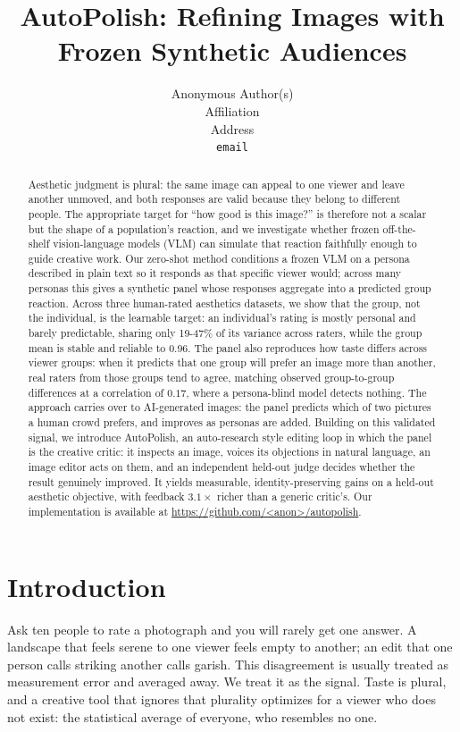 \documentclass{article}
\title{AutoPolish: Refining Images with Frozen Synthetic Audiences}
\author{%
  Anonymous Author(s)\\
  Affiliation\\
  Address\\
  \texttt{email}\\
}
\begin{document}
\maketitle


\begin{abstract}
Aesthetic judgment is plural: the same image can appeal to one viewer and leave another unmoved, and both responses are valid because they belong to different people. The appropriate target for ``how good is this image?'' is therefore not a scalar but the shape of a population's reaction, and we investigate whether frozen off-the-shelf vision-language models (VLM) can simulate that reaction faithfully enough to guide creative work. Our zero-shot method conditions a frozen VLM on a persona described in plain text so it responds as that specific viewer would; across many personas this gives a synthetic panel whose responses aggregate into a predicted group reaction. Across three human-rated aesthetics datasets, we show that the group, not the individual, is the learnable target: an individual's rating is mostly personal and barely predictable, sharing only 19-47\% of its variance across raters, while the group mean is stable and reliable to 0.96. The panel also reproduces how taste differs across viewer groups: when it predicts that one group will prefer an image more than another, real raters from those groups tend to agree, matching observed group-to-group differences at a correlation of $0.17$, where a persona-blind model detects nothing. The approach carries over to AI-generated images: the panel predicts which of two pictures a human crowd prefers, and improves as personas are added. Building on this validated signal, we introduce AutoPolish, an auto-research style editing loop in which the panel is the creative critic: it inspects an image, voices its objections in natural language, an image editor acts on them, and an independent held-out judge decides whether the result genuinely improved. It yields measurable, identity-preserving gains on a held-out aesthetic objective, with feedback $3.1\times$ richer than a generic critic's. Our implementation is available at \url{https://github.com/<anon>/autopolish}.
\end{abstract}


\section{Introduction}

Ask ten people to rate a photograph and you will rarely get one answer. A landscape that feels serene to one viewer feels empty to another; an edit that one person calls striking another calls garish. This disagreement is usually treated as measurement error and averaged away. We treat it as the signal. Taste is plural, and a creative tool that ignores that plurality optimizes for a viewer who does not exist: the statistical average of everyone, who resembles no one.
\end{document}
